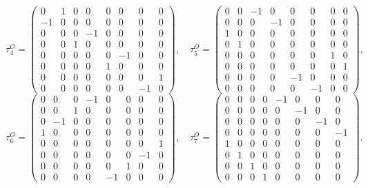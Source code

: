 \documentclass[10pt,a4paper]{article}
\begin{document}
\begin{equation*}
\tau^{O}_4=\begin{pmatrix}0 & 1 & 0 & 0 & 0 & 0 & 0 & 0 \\ -1 & 0 & 0 & 0 & 0 & 0 & 0 & 0 \\ 0 & 0 & 0 & -1 & 0 & 0 & 0 & 0 \\ 0 & 0 & 1 & 0 & 0 & 0 & 0 & 0 \\ 0 & 0 & 0 & 0 & 0 & -1 & 0 & 0 \\ 0 & 0 & 0 & 0 & 1 & 0 & 0 & 0 \\ 0 & 0 & 0 & 0 & 0 & 0 & 0 & 1 \\ 0 & 0 & 0 & 0 & 0 & 0 & -1 & 0\end{pmatrix},\quad \tau^{O}_5=\begin{pmatrix}0 & 0 & -1 & 0 & 0 & 0 & 0 & 0 \\ 0 & 0 & 0 & -1 & 0 & 0 & 0 & 0 \\ 1 & 0 & 0 & 0 & 0 & 0 & 0 & 0 \\ 0 & 1 & 0 & 0 & 0 & 0 & 0 & 0 \\ 0 & 0 & 0 & 0 & 0 & 0 & 1 & 0 \\ 0 & 0 & 0 & 0 & 0 & 0 & 0 & 1 \\ 0 & 0 & 0 & 0 & -1 & 0 & 0 & 0 \\ 0 & 0 & 0 & 0 & 0 & -1 & 0 & 0\end{pmatrix},
\end{equation*}
\begin{equation*}
\tau^{O}_6=\begin{pmatrix}0 & 0 & 0 & -1 & 0 & 0 & 0 & 0 \\ 0 & 0 & 1 & 0 & 0 & 0 & 0 & 0 \\ 0 & -1 & 0 & 0 & 0 & 0 & 0 & 0 \\ 1 & 0 & 0 & 0 & 0 & 0 & 0 & 0 \\ 0 & 0 & 0 & 0 & 0 & 0 & 0 & 1 \\ 0 & 0 & 0 & 0 & 0 & 0 & -1 & 0 \\ 0 & 0 & 0 & 0 & 0 & 1 & 0 & 0 \\ 0 & 0 & 0 & 0 & -1 & 0 & 0 & 0\end{pmatrix},\quad \tau^{O}_7=\begin{pmatrix}0 & 0 & 0 & 0 & -1 & 0 & 0 & 0 \\ 0 & 0 & 0 & 0 & 0 & -1 & 0 & 0 \\ 0 & 0 & 0 & 0 & 0 & 0 & -1 & 0 \\ 0 & 0 & 0 & 0 & 0 & 0 & 0 & -1 \\ 1 & 0 & 0 & 0 & 0 & 0 & 0 & 0 \\ 0 & 1 & 0 & 0 & 0 & 0 & 0 & 0 \\ 0 & 0 & 1 & 0 & 0 & 0 & 0 & 0 \\ 0 & 0 & 0 & 1 & 0 & 0 & 0 & 0\end{pmatrix}.
\end{equation*}
\end{document}
